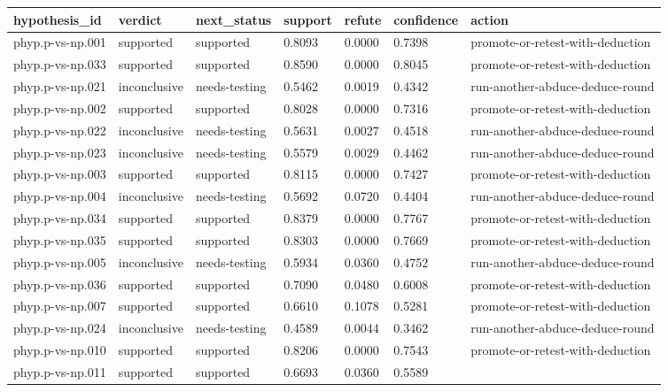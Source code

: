 \documentclass[
]{article}
\newcounter{none} %
\begin{document}
{\def\LTcaptype{none} %
\begin{longtable}[]{@{}lllllll@{}}
\toprule\noalign{}
hypothesis\_id & verdict & next\_status & support & refute & confidence
& action \\
\midrule\noalign{}
\endhead
\bottomrule\noalign{}
\endlastfoot
phyp.p-vs-np.001 & supported & supported & 0.8093 & 0.0000 & 0.7398 &
promote-or-retest-with-deduction \\
phyp.p-vs-np.033 & supported & supported & 0.8590 & 0.0000 & 0.8045 &
promote-or-retest-with-deduction \\
phyp.p-vs-np.021 & inconclusive & needs-testing & 0.5462 & 0.0019 &
0.4342 & run-another-abduce-deduce-round \\
phyp.p-vs-np.002 & supported & supported & 0.8028 & 0.0000 & 0.7316 &
promote-or-retest-with-deduction \\
phyp.p-vs-np.022 & inconclusive & needs-testing & 0.5631 & 0.0027 &
0.4518 & run-another-abduce-deduce-round \\
phyp.p-vs-np.023 & inconclusive & needs-testing & 0.5579 & 0.0029 &
0.4462 & run-another-abduce-deduce-round \\
phyp.p-vs-np.003 & supported & supported & 0.8115 & 0.0000 & 0.7427 &
promote-or-retest-with-deduction \\
phyp.p-vs-np.004 & inconclusive & needs-testing & 0.5692 & 0.0720 &
0.4404 & run-another-abduce-deduce-round \\
phyp.p-vs-np.034 & supported & supported & 0.8379 & 0.0000 & 0.7767 &
promote-or-retest-with-deduction \\
phyp.p-vs-np.035 & supported & supported & 0.8303 & 0.0000 & 0.7669 &
promote-or-retest-with-deduction \\
phyp.p-vs-np.005 & inconclusive & needs-testing & 0.5934 & 0.0360 &
0.4752 & run-another-abduce-deduce-round \\
phyp.p-vs-np.036 & supported & supported & 0.7090 & 0.0480 & 0.6008 &
promote-or-retest-with-deduction \\
phyp.p-vs-np.007 & supported & supported & 0.6610 & 0.1078 & 0.5281 &
promote-or-retest-with-deduction \\
phyp.p-vs-np.024 & inconclusive & needs-testing & 0.4589 & 0.0044 &
0.3462 & run-another-abduce-deduce-round \\
phyp.p-vs-np.010 & supported & supported & 0.8206 & 0.0000 & 0.7543 &
promote-or-retest-with-deduction \\
phyp.p-vs-np.011 & supported & supported & 0.6693 & 0.0360 & 0.5589 &

\end{longtable}}
\end{document}
